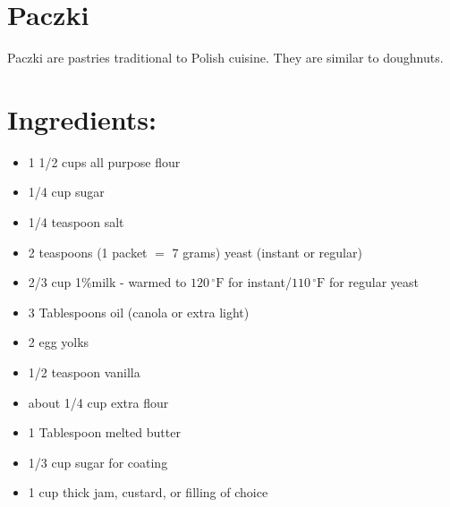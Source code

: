 \section{Paczki}
Paczki are pastries traditional to Polish cuisine. They are similar to doughnuts.
\section{Ingredients:}
\begin{itemize}
\item 1 1/2 cups all purpose flour
\item 1/4 cup sugar
\item 1/4 teaspoon salt
\item 2 teaspoons (1 packet $=$ 7 grams) yeast (instant or regular)
\item 2/3 cup 1\%milk - warmed to $120\,^{\circ}\mathrm{F}$ for instant/$110\,^{\circ}\mathrm{F}$ for regular yeast
\item 3 Tablespoons oil (canola or extra light)
\item 2 egg yolks
\item 1/2 teaspoon vanilla
\item about 1/4 cup extra flour
\\

\item 1 Tablespoon melted butter
\item 1/3 cup sugar for coating
\item 1 cup thick jam, custard, or filling of choice
\end{itemize}

